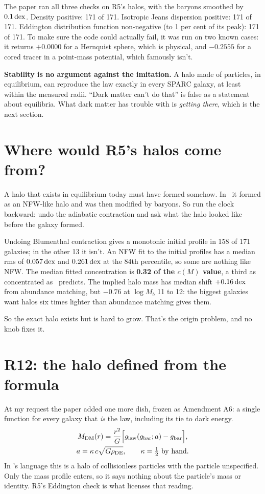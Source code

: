 The paper ran all three checks on R5's halos, with the baryons smoothed by $0.1\,\mathrm{dex}$. Density positive: 171 of 171. Isotropic Jeans dispersion positive: 171 of 171. Eddington distribution function non-negative (to 1 per cent of its peak): 171 of 171. To make sure the code could actually fail, it was run on two known cases: it returns $+0.0000$ for a Hernquist sphere, which is physical, and $-0.2555$ for a cored tracer in a point-mass potential, which famously isn't.

\begin{honestbox}
\textbf{Stability is no argument against the imitation.} A halo made of particles, in equilibrium, can reproduce the law exactly in every SPARC galaxy, at least within the measured radii. ``Dark matter can't do that'' is false as a statement about equilibria. What dark matter has trouble with is \emph{getting there}, which is the next section.
\end{honestbox}

\section{Where would R5's halos come from?}

A halo that exists in equilibrium today must have formed somehow. In \LCDM\ it formed as an NFW-like halo and was then modified by baryons. So run the clock backward: undo the adiabatic contraction and ask what the halo looked like before the galaxy formed.

Undoing Blumenthal contraction gives a monotonic initial profile in 158 of 171 galaxies; in the other 13 it isn't. An NFW fit to the initial profiles has a median rms of $0.057\,\mathrm{dex}$ and $0.261\,\mathrm{dex}$ at the 84th percentile, so some are nothing like NFW. The median fitted concentration is \textbf{0.32 of the $c(M)$ value}, a third as concentrated as \LCDM\ predicts. The implied halo mass has median shift $+0.16\,\mathrm{dex}$ from abundance matching, but $-0.76$ at $\log M_b$ 11 to 12: the biggest galaxies want halos six times lighter than abundance matching gives them.

So the exact halo exists but is hard to grow. That's the origin problem, and no knob fixes it.

\section{R12: the halo defined from the formula}

At my request the paper added one more dish, frozen as Amendment A6: a single function for every galaxy that \emph{is} the law, including its tie to dark energy.
\begin{gather}
M_{\rm DM}(r)=\frac{r^2}{G}\Bigl[g_{\rm law}(g_{\rm bar};a)-g_{\rm bar}\Bigr],\\
a=\kappa\,c\sqrt{G\rho_{\rm DE}},\qquad\kappa=\tfrac12\ \text{by hand}.
\end{gather}
In \LCDM's language this is a halo of collisionless particles with the particle unspecified. Only the mass profile enters, so it says nothing about the particle's mass or identity. R5's Eddington check is what licenses that reading.

